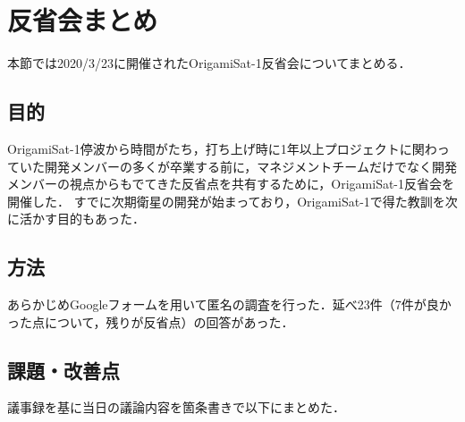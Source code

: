 \section{反省会まとめ}


本節では2020/3/23に開催されたOrigamiSat-1反省会についてまとめる．

\subsection{目的}
OrigamiSat-1停波から時間がたち，打ち上げ時に1年以上プロジェクトに関わっていた開発メンバーの多くが卒業する前に，マネジメントチームだけでなく開発メンバーの視点からもでてきた反省点を共有するために，OrigamiSat-1反省会を開催した．
すでに次期衛星の開発が始まっており，OrigamiSat-1で得た教訓を次に活かす目的もあった．

\subsection{方法}
あらかじめGoogleフォームを用いて匿名の調査を行った．延べ23件（7件が良かった点について，残りが反省点）の回答があった．





\subsection{課題・改善点}
議事録を基に当日の議論内容を箇条書きで以下にまとめた．

